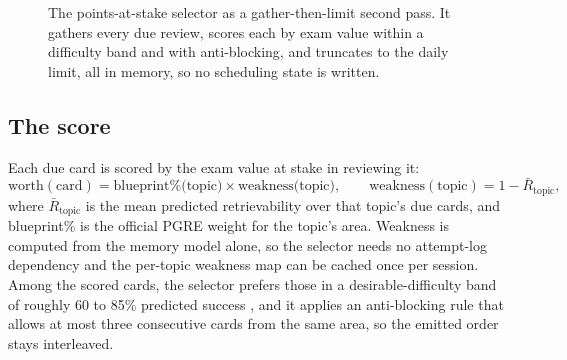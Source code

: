 \documentclass[11pt]{article}
\begin{document}
\begin{figure}[t]
\centering
{}
\caption{The points-at-stake selector as a gather-then-limit second pass. It gathers
every due review, scores each by exam value within a difficulty band and with
anti-blocking, and truncates to the daily limit, all in memory, so no scheduling state
is written.}
\label{fig:selector}
\end{figure}

\subsection{The score}

Each due card is scored by the exam value at stake in reviewing it:
\[
\text{worth}(\text{card}) = \text{blueprint}\%\big(\text{topic}\big) \times \text{weakness}\big(\text{topic}\big),
\qquad
\text{weakness}(\text{topic}) = 1 - \bar{R}_{\text{topic}},
\]
where $\bar{R}_{\text{topic}}$ is the mean predicted retrievability over that topic's
due cards, and blueprint\% is the official PGRE weight for the topic's area. Weakness
is computed from the memory model alone, so the selector needs no attempt-log
dependency and the per-topic weakness map can be cached once per session. Among the
scored cards, the selector prefers those in a desirable-difficulty band of roughly 60
to 85\% predicted success \citep{wilson2019, metcalfe2005}, and it applies an
anti-blocking rule that allows at most three consecutive cards from the same area, so
the emitted order stays interleaved.
\end{document}
